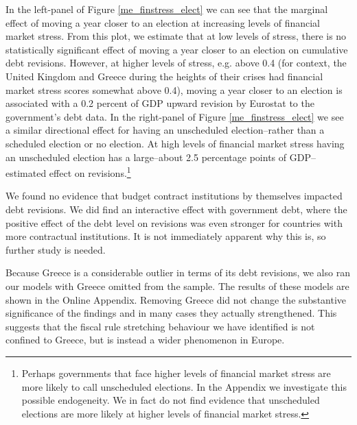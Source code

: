 \documentclass[]{article}
\begin{document}
In the left-panel of Figure \ref{me_finstress_elect} we can see that the marginal effect of moving a year closer to an election at increasing levels of financial market stress. From this plot, we estimate that at low levels of stress, there is no statistically significant effect of moving a year closer to an election on cumulative debt revisions. However, at higher levels of stress, e.g. above 0.4 (for context, the United Kingdom and Greece during the heights of their crises had financial market stress scores somewhat above 0.4), moving a year closer to an election is associated with a 0.2 percent of GDP upward revision by Eurostat to the government's debt data. In the right-panel of Figure \ref{me_finstress_elect} we see a similar directional effect for having an unscheduled election--rather than a scheduled election or no election. At high levels of financial market stress having an unscheduled election has a large--about 2.5 percentage points of GDP--estimated effect on revisions.\footnote{Perhaps governments that face higher levels of financial market stress are more likely to call unscheduled elections. In the Appendix we investigate this possible endogeneity. We in fact do not find evidence that unscheduled elections are more likely at higher levels of financial market stress.}

We found no evidence that budget contract institutions by themselves impacted debt revisions. We did find an interactive effect with government debt, where the positive effect of the debt level on revisions was even stronger for countries with more contractual institutions. It is not immediately apparent why this is, so further study is needed. 

Because Greece is a considerable outlier in terms of its debt revisions, we also ran our models with Greece omitted from the sample. The results of these models are shown in the Online Appendix. Removing Greece did not change the substantive significance of the findings and in many cases they actually strengthened. This suggests that the fiscal rule stretching behaviour we have identified is not confined to Greece, but is instead a wider phenomenon in Europe.
\end{document}
